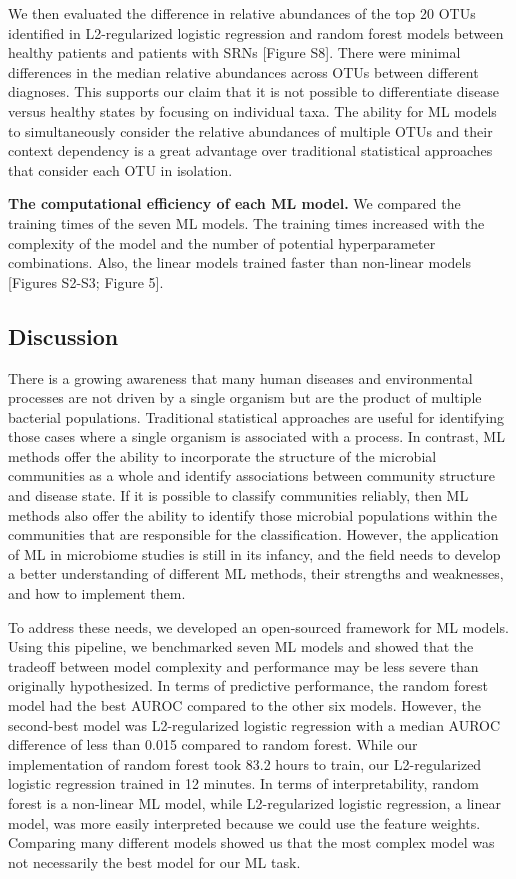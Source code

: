 \documentclass[
  11pt,
]{article}
\begin{document}
We then evaluated the difference in relative abundances of the top 20
OTUs identified in L2-regularized logistic regression and random forest
models between healthy patients and patients with SRNs {[}Figure S8{]}.
There were minimal differences in the median relative abundances across
OTUs between different diagnoses. This supports our claim that it is not
possible to differentiate disease versus healthy states by focusing on
individual taxa. The ability for ML models to simultaneously consider
the relative abundances of multiple OTUs and their context dependency is
a great advantage over traditional statistical approaches that consider
each OTU in isolation.

\textbf{The computational efficiency of each ML model.} We compared the
training times of the seven ML models. The training times increased with
the complexity of the model and the number of potential hyperparameter
combinations. Also, the linear models trained faster than non-linear
models {[}Figures S2-S3; Figure 5{]}.

\hypertarget{discussion}{%
\subsection{Discussion}\label{discussion}}

There is a growing awareness that many human diseases and environmental
processes are not driven by a single organism but are the product of
multiple bacterial populations. Traditional statistical approaches are
useful for identifying those cases where a single organism is associated
with a process. In contrast, ML methods offer the ability to incorporate
the structure of the microbial communities as a whole and identify
associations between community structure and disease state. If it is
possible to classify communities reliably, then ML methods also offer
the ability to identify those microbial populations within the
communities that are responsible for the classification. However, the
application of ML in microbiome studies is still in its infancy, and the
field needs to develop a better understanding of different ML methods,
their strengths and weaknesses, and how to implement them.

To address these needs, we developed an open-sourced framework for ML
models. Using this pipeline, we benchmarked seven ML models and showed
that the tradeoff between model complexity and performance may be less
severe than originally hypothesized. In terms of predictive performance,
the random forest model had the best AUROC compared to the other six
models. However, the second-best model was L2-regularized logistic
regression with a median AUROC difference of less than 0.015 compared to
random forest. While our implementation of random forest took 83.2 hours
to train, our L2-regularized logistic regression trained in 12 minutes.
In terms of interpretability, random forest is a non-linear ML model,
while L2-regularized logistic regression, a linear model, was more
easily interpreted because we could use the feature weights. Comparing
many different models showed us that the most complex model was not
necessarily the best model for our ML task.
\end{document}
